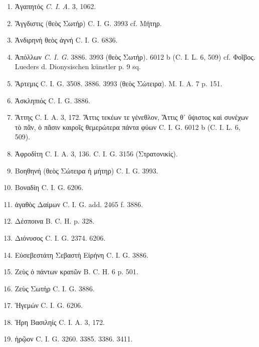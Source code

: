 \documentclass[a4paper, 11pt, oneside, polutonikogreek, german, twocolumn]{article}
\begin{document}
\begin{enumerate}
\item Ἀγαπητός \emph{C. I. A.} 3, 1062.

\item Ἄγγδιστις (θεὸς Σωτήρ) C. I. G. 3993 cf. Μήτηρ.

\item Ἀνδιρηνὴ θεὸς ἁγνή C. I. G. 6836.

\item Ἀπόλλων \emph{C. I. G.} 3886. 3993 (θεὸς Σωτήρ). 6012 b (C. I. L. 6, 509) cf. Φοῖβος. Lueders d. Dionysischen künstler p. 9 sq.

\item Ἄρτεμις C. I. G. 3508. 3886. 3993 (θεὸς Σώτειρα). M. I. A. 7 p. 151.

\item Ἀσκληπιός C. I. G. 3886.

\item Ἄττης C. I. A. 3, 172. Ἄττις τεκέων τε γένεθλον, Ἄττις θ᾽ ὕψιστος καὶ συνέχων τὸ πᾶν, ὁ πᾶσιν καιροῖς θεμερώτερα πάντα φύων C. I. G. 6012 b (C. I. L. 6, 509).

\item Ἀφροδίτη C. I. A. 3, 136. C. I. G. 3156 (Στρατονικίς).

\item Βοηθηνή (θεὸς Σώτειρα ἡ μήτηρ) C. I. G. 3993.

\item Βοναδίη C. I. G. 6206.

\item ἀγαθὸς Δαίμων C. I. G. add. 2465 f. 3886.

\item Δέσποινα B. C. H. p. 328.

\item Διόνυσος C. I. G. 2374. 6206.

\item Εὐσεβεστάτη Σεβαστὴ Εἰρήνη C. I. G. 3886.

\item Ζεὺς ὁ πάντων κρατῶν B. C. H. 6 p. 501.

\item Ζεὺς Σωτήρ C. I. G. 3886.

\item Ἡγεμών C. I. G. 6206.

\item Ἡρη Βασιληίς C. I. A. 3, 172.

\item ἡρῷον C. I. G. 3260. 3385. 3386. 3411.


\end{enumerate}
\end{document}
